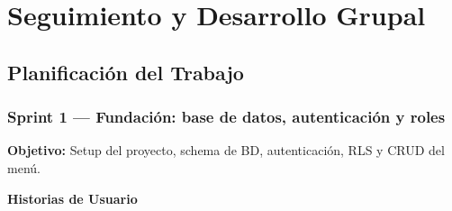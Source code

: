 \chapter{Seguimiento y Desarrollo Grupal}

\section{Planificación del Trabajo}

\subsection*{Sprint 1 — Fundación: base de datos, autenticación y roles}

\textbf{Objetivo:}  
Setup del proyecto, schema de BD, autenticación, RLS y CRUD del menú.

\textbf{Historias de Usuario}

